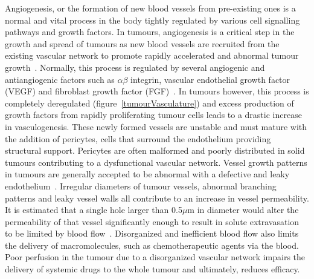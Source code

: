 	Angiogenesis, or the formation of new blood vessels from pre-existing ones is a normal and vital
	process in the body tightly regulated by various cell signalling pathways and growth factors. In
	tumours, angiogenesis is a critical step in the growth and spread of tumours as new blood
	vessels are recruited from the existing vascular network to promote rapidly accelerated and
	abnormal tumour growth~\cite{Folkman:1990ud}. Normally, this process is regulated by several
	angiogenic and antiangiogenic factors such as $\alpha \beta$ integrin, vascular endothelial
	growth factor (VEGF) and fibroblast growth factor (FGF)~\cite{Laking:2006}. In tumours however,
	this process is completely deregulated (figure~\ref{tumourVasculature}) and excess production of
	growth factors from rapidly proliferating tumour cells leads to a drastic increase in
	vasculogenesis. These newly formed vessels are unstable and must mature with the addition of
	pericytes, cells that surround the endothelium providing structural support. Pericytes are often
	malformed and poorly distributed in solid tumours contributing to a dysfunctional vascular
	network. Vessel growth patterns in tumours are generally accepted to be abnormal with a
	defective and leaky endothelium~\cite{McDonald:2002}. Irregular diameters of tumour vessels,
	abnormal branching patterns and leaky vessel walls all contribute to an increase in vessel
	permeability. It is estimated that a single hole larger than 0.5$\mu$m in diameter would alter
	the permeability of that vessel significantly enough to result in solute extravasation to be
	limited by blood flow~\cite{McDonald:2002}. Disorganized and inefficient blood flow also limits
	the delivery of macromolecules, such as chemotherapeutic agents via the blood. Poor perfusion in
	the tumour due to a disorganized vascular network impairs the delivery of systemic drugs to the
	whole tumour and ultimately, reduces efficacy.

